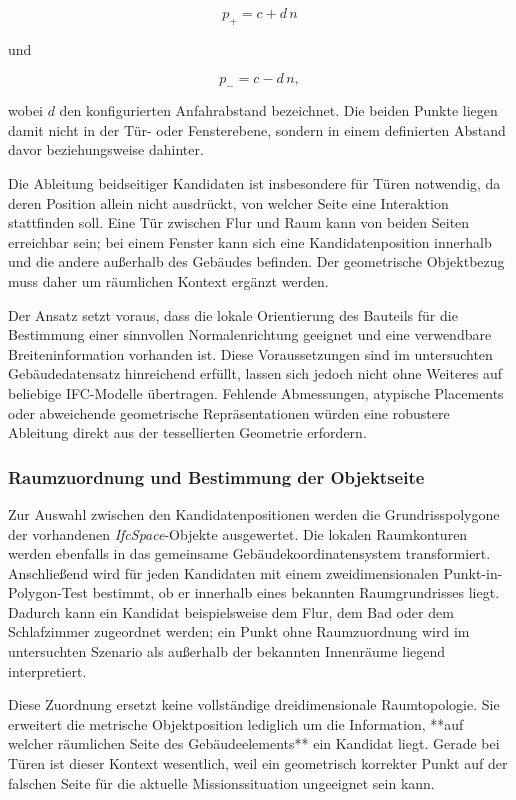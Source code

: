 \[
p_+ = c+d\,n
\]

und

\[
p_- = c-d\,n,
\]

wobei \(d\) den konfigurierten Anfahrabstand bezeichnet. Die beiden Punkte liegen damit nicht in der Tür- oder Fensterebene, sondern in einem definierten Abstand davor beziehungsweise dahinter.

Die Ableitung beidseitiger Kandidaten ist insbesondere für Türen notwendig, da deren Position allein
nicht ausdrückt, von welcher Seite eine Interaktion stattfinden soll. Eine Tür zwischen Flur und
Raum kann von beiden Seiten erreichbar sein; bei einem Fenster kann sich eine Kandidatenposition
innerhalb und die andere außerhalb des Gebäudes befinden. Der geometrische Objektbezug muss daher um
räumlichen Kontext ergänzt werden.

Der Ansatz setzt voraus, dass die lokale Orientierung des Bauteils für die Bestimmung einer
sinnvollen Normalenrichtung geeignet und eine verwendbare Breiteninformation vorhanden ist. Diese
Voraussetzungen sind im untersuchten Gebäudedatensatz hinreichend erfüllt, lassen sich jedoch nicht
ohne Weiteres auf beliebige IFC-Modelle übertragen. Fehlende Abmessungen, atypische Placements oder
abweichende geometrische Repräsentationen würden eine robustere Ableitung direkt aus der
tessellierten Geometrie erfordern.

\subsubsection{Raumzuordnung und Bestimmung der Objektseite}
Zur Auswahl zwischen den Kandidatenpositionen werden die Grundrisspolygone der vorhandenen
\textit{IfcSpace}-Objekte ausgewertet. Die lokalen Raumkonturen werden ebenfalls in das gemeinsame
Gebäudekoordinatensystem transformiert. Anschließend wird für jeden Kandidaten mit einem
zweidimensionalen Punkt-in-Polygon-Test bestimmt, ob er innerhalb eines bekannten Raumgrundrisses
liegt. Dadurch kann ein Kandidat beispielsweise dem Flur, dem Bad oder dem Schlafzimmer zugeordnet
werden; ein Punkt ohne Raumzuordnung wird im untersuchten Szenario als außerhalb der bekannten
Innenräume liegend interpretiert.

Diese Zuordnung ersetzt keine vollständige dreidimensionale Raumtopologie. Sie erweitert die
metrische Objektposition lediglich um die Information, **auf welcher räumlichen Seite des
Gebäudeelements** ein Kandidat liegt. Gerade bei Türen ist dieser Kontext wesentlich, weil ein
geometrisch korrekter Punkt auf der falschen Seite für die aktuelle Missionssituation ungeeignet
sein kann.

